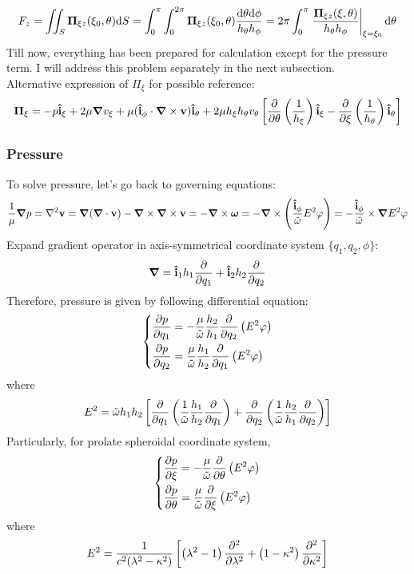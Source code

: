 \documentclass[fontsize=11pt, %
                             paper=a4, %
                             twoside, %
                             captions=tableheading,
                             index=totoc,
                             hyperref]{labbook}
\begin{document}
\begin{addmargin}[4cm]{0cm}
\begin{equation}
F_z=\iint_S\mbox{\boldmath$ \Pi $}_{\xi z}(\xi_0,\theta)\mathrm{d}S=\int_0^\pi\int_0^{2\pi} \mbox{\boldmath$ \Pi $}_{\xi z}(\xi_0,\theta)\frac{\mathrm{d}\theta\mathrm{d}\phi}{h_\theta h_\phi}=2\pi\int_0^\pi \left.\frac{\mbox{\boldmath$ \Pi $}_{\xi z}(\xi,\theta)}{h_\theta h_\phi}\right|_{\xi=\xi_0}\mathrm{d}\theta
\end{equation}
Till now, everything has been prepared for calculation except for the pressure term. I will address this problem separately in the next subsection.\\
Alternative expression of $\Pi_\xi$ for possible reference:
\begin{equation}
\mbox{\boldmath$ \Pi $}_\xi=-p\mathbf{\hat{i}}_\xi + 2\mu \mbox{\boldmath$ \nabla $} v_\xi+\mu  (\mathbf{\hat{i}}_\phi \cdot \mbox{\boldmath$ \nabla $} \times \mathbf{v})\mathbf{\hat{i}}_\theta+2\mu h_\xi h_\theta v_\theta\left[\frac{\partial }{\partial \theta}\left(\frac{1}{h_\xi}\right)\mathbf{\hat{i}}_\xi - \frac{\partial }{\partial \xi}\left(\frac{1}{h_\theta}\right)\mathbf{\hat{i}}_\theta\right]
\end{equation}
\subsubsection{Pressure}
To solve pressure, let's go back to governing equations:
\begin{equation}
\frac{1}{\mu}\mbox{\boldmath$ \nabla $} p=\nabla^2\mathbf{v}=\mbox{\boldmath$ \nabla $} (\mbox{\boldmath$ \nabla $} \cdot \mathbf{v})-\mbox{\boldmath$ \nabla $} \times \mbox{\boldmath$ \nabla $} \times \mathbf{v}=-\mbox{\boldmath$ \nabla $} \times \mbox{\boldmath$ \omega $}=-\mbox{\boldmath$ \nabla $} \times \left(\frac{\mathbf{\hat{i}}_\phi}{\tilde\omega}E^2\varphi\right)=-\frac{\mathbf{\hat{i}}_\phi}{\tilde\omega}\times \mbox{\boldmath$ \nabla $} E^2\varphi
\end{equation}
Expand gradient operator in axis-symmetrical coordinate system $\{q_1,q_2,\phi\}$:
\begin{equation}
\mbox{\boldmath$ \nabla $} = \mathbf{\hat{i}}_1 h_1\frac{\partial }{\partial q_1}+\mathbf{\hat{i}}_2 h_2\frac{\partial }{\partial q_2}
\end{equation}
Therefore, pressure is given by following differential equation:
\begin{equation}
\left\{
\begin{aligned}
\frac{\partial p}{\partial q_1}&=-\frac{\mu}{\tilde\omega}\frac{h_2}{h_1}\frac{\partial }{\partial q_2}\left(E^2 \varphi\right)\\
\frac{\partial p}{\partial q_2}&=\frac{\mu}{\tilde\omega}\frac{h_1}{h_2}\frac{\partial }{\partial q_1}\left(E^2 \varphi\right)
\end{aligned}
\right.
\end{equation}
where
\begin{equation}
E^2=\tilde{\omega}h_1h_2\left[\frac{\partial }{\partial q_1}\left(\frac{1}{\tilde{\omega}}\frac{h_1}{h_2}\frac{\partial }{\partial q_1}\right)+\frac{\partial }{\partial q_2}\left(\frac{1}{\tilde{\omega}}\frac{h_2}{h_1}\frac{\partial }{\partial q_2}\right)\right]
\end{equation}
Particularly, for prolate spheroidal coordinate system,
\begin{equation}\label{eqn-pressure}
\left\{
\begin{aligned}
\frac{\partial p}{\partial \xi}&=-\frac{\mu}{\tilde\omega}\frac{\partial }{\partial \theta}\left(E^2 \varphi\right)\\
\frac{\partial p}{\partial \theta}&=\frac{\mu}{\tilde\omega}\frac{\partial }{\partial \xi}\left(E^2 \varphi\right)
\end{aligned}
\right.
\end{equation}
where
\begin{equation}
E^2=\frac{1}{c^2(\lambda^2-\kappa^2)}\left[\left(\lambda^2-1\right)\frac{\partial^2 }{\partial \lambda^2}+\left(1-\kappa^2\right)\frac{\partial^2 }{\partial \kappa^2}\right]
\end{equation}

\end{addmargin}
\end{document}
